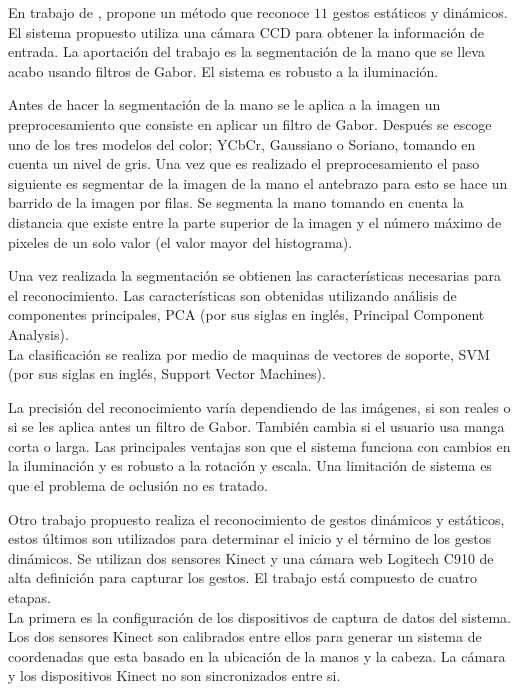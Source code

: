 
En trabajo de \citep{Huang2011}, propone un método que reconoce $11$ gestos estáticos y dinámicos. El sistema propuesto utiliza una cámara CCD para obtener la información de entrada. La aportación del trabajo es la segmentación de la mano que se lleva acabo usando filtros de Gabor. El sistema es robusto a la iluminación. 
 
Antes de hacer la segmentación de la mano se le aplica a la imagen un preprocesamiento que consiste en aplicar un filtro de Gabor. Después se escoge uno de los tres modelos del color; YCbCr, Gaussiano o Soriano, tomando en cuenta un nivel de gris.  
Una vez que es realizado el preprocesamiento el paso siguiente es segmentar de la imagen de la mano el antebrazo para esto se hace un barrido de la imagen por filas. Se segmenta la mano tomando en cuenta la distancia que existe entre la parte superior de la imagen y el número máximo de pixeles de un solo valor (el valor mayor del histograma).

Una vez realizada la segmentación se obtienen las características necesarias para el reconocimiento. Las características son obtenidas utilizando análisis de componentes principales, PCA (por sus siglas en inglés, Principal Component Analysis).\\
La clasificación se realiza por medio de maquinas de vectores de soporte, SVM (por sus siglas en inglés, Support Vector Machines).   

La precisión del reconocimiento varía dependiendo de las imágenes, si son reales o si se les aplica antes un filtro de Gabor. También cambia si el usuario usa manga corta o larga.  
Las principales ventajas son que el sistema funciona con cambios en la iluminación y es robusto a la rotación y escala. Una limitación de sistema es que el problema de oclusi\'on no es tratado. 


Otro trabajo propuesto \citep{Caputo2012} realiza el reconocimiento de  gestos dinámicos y estáticos, estos últimos son utilizados para determinar el inicio y el término de los gestos dinámicos. Se utilizan dos sensores Kinect y una cámara web Logitech C910 de alta definición para capturar los gestos. El trabajo está compuesto de cuatro etapas.\\
La primera es la configuración de los dispositivos de captura de datos del sistema. Los dos sensores Kinect son calibrados entre ellos para generar un sistema de coordenadas que esta basado en la ubicación de la  manos y la cabeza. La cámara y los dispositivos Kinect no son sincronizados entre si.  

